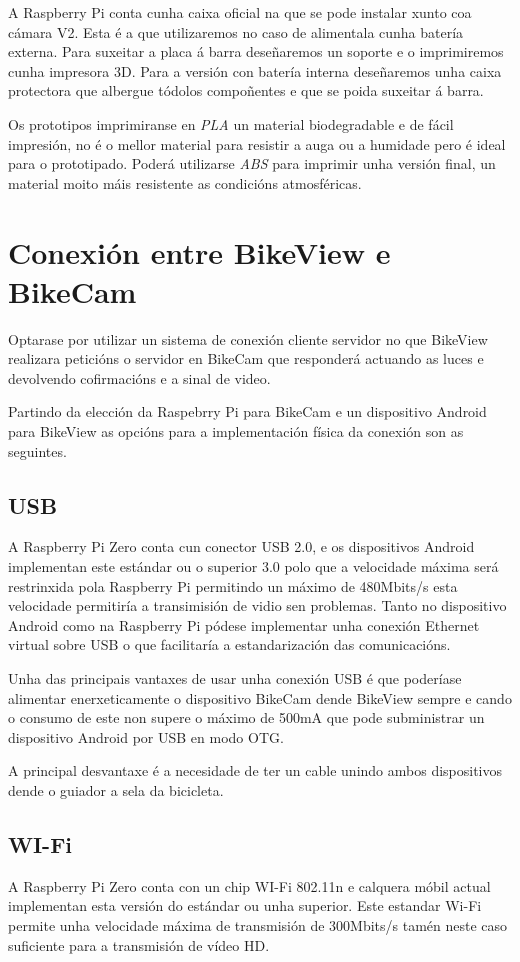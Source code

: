 A Raspberry Pi conta cunha caixa oficial na que se pode instalar xunto coa cámara V2. Esta é a que utilizaremos no caso de alimentala cunha batería externa. Para suxeitar a placa á barra deseñaremos un soporte e o imprimiremos cunha impresora 3D. Para a versión con batería interna deseñaremos unha caixa protectora que albergue tódolos compoñentes e que se poida suxeitar á barra.

Os prototipos imprimiranse en \emph{PLA} un material biodegradable e de fácil impresión, no é o mellor material para resistir a auga ou a humidade pero é ideal para o prototipado. Poderá utilizarse \emph{ABS} para imprimir unha versión final, un material moito máis resistente as condicións atmosféricas.

\section{Conexión entre BikeView e BikeCam}
Optarase por utilizar un sistema de conexión cliente servidor no que BikeView realizara peticións o servidor en BikeCam que responderá actuando as luces e devolvendo cofirmacións e a sinal de video.

Partindo da elección da Raspebrry Pi para BikeCam e un dispositivo Android para BikeView as opcións para a implementación física da conexión son as seguintes.

\subsection{USB}
A Raspberry Pi Zero conta cun conector USB 2.0, e os dispositivos Android implementan este estándar ou o superior 3.0 polo que a velocidade máxima será restrinxida pola Raspberry Pi permitindo un máximo de 480Mbits/s esta velocidade permitiría a transimisión de vidio sen problemas.
Tanto no dispositivo Android como na Raspberry Pi pódese implementar unha conexión Ethernet virtual sobre USB o que facilitaría a estandarización das comunicacións.

Unha das principais vantaxes de usar unha conexión USB é que poderíase alimentar enerxeticamente o dispositivo BikeCam dende BikeView sempre e cando o consumo de este non supere o máximo de 500mA que pode subministrar un dispositivo Android por USB en modo OTG.

A principal desvantaxe é a necesidade de ter un cable unindo ambos dispositivos dende o guiador a sela da bicicleta.
\subsection{WI-Fi}
A Raspberry Pi Zero conta con un chip WI-Fi 802.11n e calquera móbil actual implementan esta versión do estándar ou unha superior. Este estandar Wi-Fi permite unha velocidade máxima de transmisión de 300Mbits/s tamén neste caso suficiente para a transmisión de vídeo HD.

